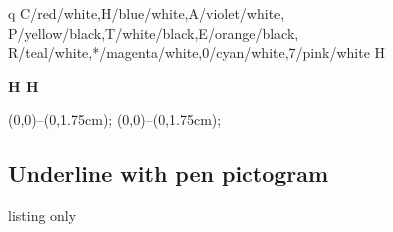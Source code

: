 \documentclass[11pt,a4paper]{ltxdoc}
\begin{document}
\begin{DemoCode}{}
{\LARGE%
q%
\tkzletterblock%
  {%
    C/red/white,H/blue/white,A/violet/white,%
    P/yellow/black,T/white/black,E/orange/black,%
    R/teal/white,*/magenta/white,0/cyan/white,7/pink/white%
  }%
H%
}
\end{DemoCode}

\begin{DemoCode}{}
\sffamily\bfseries\Huge%
H%
%
H
\end{DemoCode}

\begin{DemoCode}{}
{\tikz{} (0,0)--(0,1.75cm);}%
%
{\tikz{} (0,0)--(0,1.75cm);}%
\end{DemoCode}

\pagebreak

\subsection{Underline with pen pictogram}

\begin{DemoCode}{listing only}

\end{DemoCode}

\begin{DemoCode}{}
\par
\lipsum[1][1-3]

\par
{}\lipsum[1][1-3]
\end{DemoCode}

\begin{DemoCode}{}
{\bfseries\sffamily\LARGE\textcolor{blue}{}}\par
\lipsum[1][1-3]

{\bfseries\sffamily\LARGE\textcolor{violet}{}}\par
\lipsum[1][1-3]

{\bfseries\sffamily\LARGE\textcolor{brown}{}}\par
\lipsum[1][1-3]
\end{DemoCode}
\end{document}
